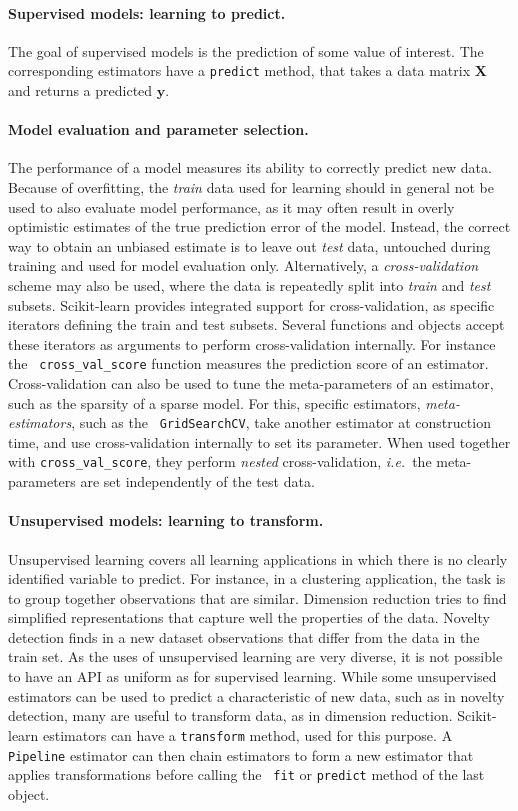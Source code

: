 \documentclass[a4paper]{article}
\begin{document}
\paragraph{Supervised models: learning to predict.}
%
The goal of supervised models is the prediction of some value of interest.
The corresponding estimators
have a {\tt predict} method, that takes a data matrix $\mathbf{X}$ and
returns a predicted $\mathbf{y}$.

\paragraph{Model evaluation and parameter selection.}
%
The performance of a model measures its ability to correctly
predict new data. Because of overfitting, the \emph{train} data used for
learning
should in general not be used to also evaluate model performance, as it may often
result in overly optimistic estimates of the true prediction error of the model.
Instead, the correct way to obtain an unbiased estimate is to leave out \emph{test} data,
untouched during training and used for model evaluation only.
Alternatively, a \emph{cross-validation} scheme may also be
used, where the data is repeatedly split into \emph{train} and
\emph{test} subsets. Scikit-learn provides integrated support for
cross-validation, as specific iterators defining the train and test
subsets. Several functions and objects accept these iterators as arguments to
perform cross-validation internally. For instance the {\tt
cross\_val\_score} function measures the prediction score of an
estimator. Cross-validation can also be used to tune the meta-parameters
of an estimator, such as the sparsity of a sparse model. For this,
specific estimators, \emph{meta-estimators}, such as the {\tt
GridSearchCV}, take another estimator at construction time, and use
cross-validation internally to set its parameter. When used together with
{\tt cross\_val\_score}, they perform \emph{nested} cross-validation,
\emph{i.e.}~the meta-parameters are set independently of the test data.

\paragraph{Unsupervised models: learning to transform.}
%
Unsupervised learning covers all learning applications in which there is
no clearly identified variable to predict. For instance, in a clustering
application, the task is to group together observations that are similar.
Dimension reduction tries to find simplified representations that capture
well the properties of the data. Novelty detection finds in a new dataset
observations that differ from the data in the train set. As the uses of
unsupervised learning are very diverse, it is not possible to have an API
as uniform as for supervised learning. While some unsupervised
estimators can be used to predict a characteristic of new data, such as
in novelty detection, many are useful to transform data, as in dimension
reduction. Scikit-learn estimators can have a {\tt transform} method, used
for this purpose. A {\tt Pipeline} estimator can then chain estimators to
form a new estimator that applies transformations before calling the {\tt
fit} or {\tt predict} method of the last object.
\end{document}
